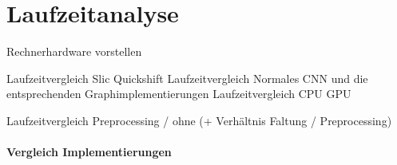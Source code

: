 \section{Laufzeitanalyse}
\label{laufzeitanalyse}

Rechnerhardware vorstellen

Laufzeitvergleich Slic Quickshift
Laufzeitvergleich Normales CNN und die entsprechenden Graphimplementierungen
Laufzeitvergleich CPU GPU

Laufzeitvergleich Preprocessing / ohne (+ Verhältnis Faltung / Preprocessing)



\paragraph{Vergleich \bzgl{} Implementierungen}
\label{vergleich_laufzeit}


